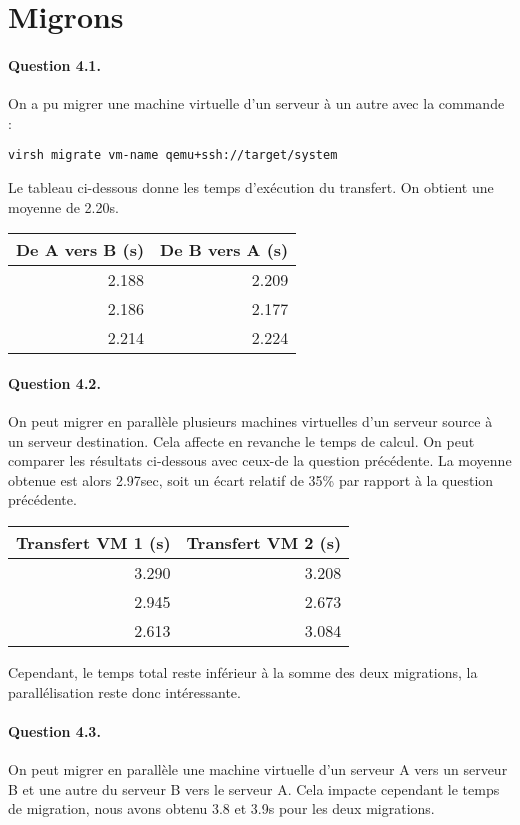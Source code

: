 \documentclass[a4paper]{article}
\begin{document}
\section{Migrons}

\paragraph{Question 4.1.}
On a pu migrer une machine virtuelle d'un serveur à un autre avec la commande :

\texttt{virsh migrate vm-name qemu+ssh://target/system}

\noindent Le tableau ci-dessous donne les temps d'exécution du transfert. On obtient une moyenne de 2.20s.
\begin{center}
\begin{tabular}{r r}
De A vers B (s) & De B vers A (s) \\ \hline
2.188 & 2.209 \\ 
2.186 & 2.177 \\
2.214 & 2.224
\end{tabular}
\end{center}

\paragraph{Question 4.2.}
On peut migrer en parallèle plusieurs machines virtuelles d'un serveur source à un serveur destination.
Cela affecte en revanche le temps de calcul. On peut comparer les résultats ci-dessous avec ceux-de la question précédente. La moyenne obtenue est alors 2.97sec, soit un écart relatif de 35\% par rapport à la question précédente.
\begin{center}
\begin{tabular}{r r}
Transfert VM 1 (s) & Transfert VM 2 (s) \\ \hline
3.290 & 3.208 \\
2.945 & 2.673 \\
2.613 & 3.084
\end{tabular}
\end{center}
\par Cependant, le temps total reste inférieur à la somme des deux migrations, la parallélisation reste donc intéressante.
\paragraph{Question 4.3.}
On peut migrer en parallèle une machine virtuelle d'un serveur A vers un serveur B et une autre du serveur B vers le serveur A.
Cela impacte cependant le temps de migration, nous avons obtenu 3.8 et 3.9s pour les deux migrations.
\end{document}

